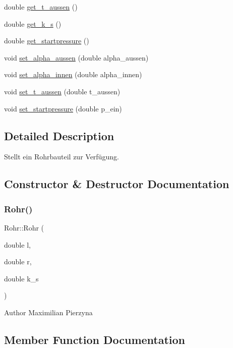 \begin{DoxyCompactItemize}
double \hyperlink{class_rohr_a5d7b97148ffb9e42e5dc9b5657a64cc0}{get\+\_\+t\+\_\+aussen} ()
\item 
double \hyperlink{class_rohr_a653e53a000dd4ed025d1adbdb83f7859}{get\+\_\+k\+\_\+s} ()
\item 
double \hyperlink{class_rohr_ad93033ce4a63458e188cfc9d8771836e}{get\+\_\+startpressure} ()
\item 
void \hyperlink{class_rohr_ae6e604082fdb43a35bcdc74478ced8a7}{set\+\_\+alpha\+\_\+aussen} (double alpha\+\_\+aussen)
\item 
void \hyperlink{class_rohr_aed25a50fcf5c735e51693303d8b41663}{set\+\_\+alpha\+\_\+innen} (double alpha\+\_\+innen)
\item 
void \hyperlink{class_rohr_a92be37f04575328b6b15de5ab2e511a9}{set\+\_\+t\+\_\+aussen} (double t\+\_\+aussen)
\item 
void \hyperlink{class_rohr_ac9d6974bc17fde3cba4b67fb571c7ab7}{set\+\_\+startpressure} (double p\+\_\+ein)
\end{DoxyCompactItemize}


\subsection{Detailed Description}
Stellt ein Rohrbauteil zur Verfügung. 

\subsection{Constructor \& Destructor Documentation}
\mbox{\label{class_rohr_afbfc5b0d4a796c1c88b89d88b7b36768}} 
\subsubsection{\texorpdfstring{Rohr()}{Rohr()}}
{\footnotesize\ttfamily Rohr\+::\+Rohr (\begin{DoxyParamCaption}\item[{double}]{l,  }\item[{double}]{r,  }\item[{double}]{k\+\_\+s }\end{DoxyParamCaption})}

\begin{DoxyAuthor}{Author}
Maximilian Pierzyna 
\end{DoxyAuthor}


\subsection{Member Function Documentation}
\mbox{\label{class_rohr_ad02b003b17d07ee5f53bc2defbe8227a}} 

